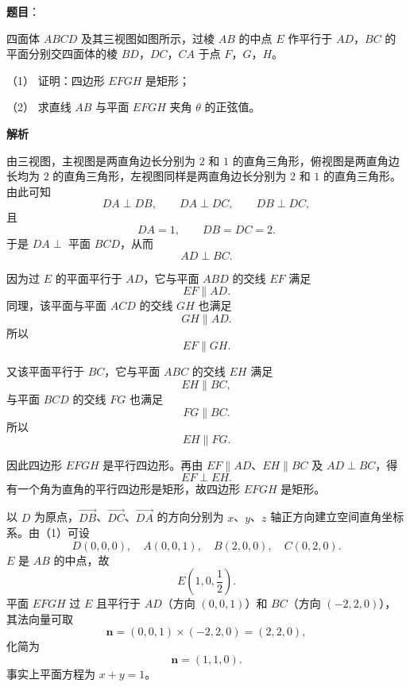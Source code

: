 \begin{answer}

\textbf{题目}：

四面体 $ABCD$ 及其三视图如图所示，过棱 $AB$ 的中点 $E$ 作平行于 $AD$，$BC$ 的平面分别交四面体的棱 $BD$，$DC$，$CA$ 于点 $F$，$G$，$H$。
\nopagebreak[4]
\begin{center}\end{center}
\nopagebreak[4]
（1） 证明：四边形 $EFGH$ 是矩形；

（2） 求直线 $AB$ 与平面 $EFGH$ 夹角 $\theta$ 的正弦值。

\textbf{解析}


由三视图，主视图是两直角边长分别为 $2$ 和 $1$ 的直角三角形，俯视图是两直角边长均为 $2$ 的直角三角形，左视图同样是两直角边长分别为 $2$ 和 $1$ 的直角三角形。由此可知
\nopagebreak[4]
\[DA\perp DB,\qquad DA\perp DC,\qquad DB\perp DC,\]
且
\nopagebreak[4]
\[DA=1,\qquad DB=DC=2.\]
于是 $DA\perp$ 平面 $BCD$，从而
\nopagebreak[4]
\[AD\perp BC.\]

因为过 $E$ 的平面平行于 $AD$，它与平面 $ABD$ 的交线 $EF$ 满足
\nopagebreak[4]
\[EF\parallel AD.\]
同理，该平面与平面 $ACD$ 的交线 $GH$ 也满足
\nopagebreak[4]
\[GH\parallel AD.\]
所以
\nopagebreak[4]
\[EF\parallel GH.\]

又该平面平行于 $BC$，它与平面 $ABC$ 的交线 $EH$ 满足
\nopagebreak[4]
\[EH\parallel BC,\]
与平面 $BCD$ 的交线 $FG$ 也满足
\nopagebreak[4]
\[FG\parallel BC.\]
所以
\nopagebreak[4]
\[EH\parallel FG.\]

因此四边形 $EFGH$ 是平行四边形。再由 $EF\parallel AD$、$EH\parallel BC$ 及 $AD\perp BC$，得
\nopagebreak[4]
\[EF\perp EH.\]
有一个角为直角的平行四边形是矩形，故四边形 $EFGH$ 是矩形。


以 $D$ 为原点，$\overrightarrow{DB}$、$\overrightarrow{DC}$、$\overrightarrow{DA}$ 的方向分别为 $x$、$y$、$z$ 轴正方向建立空间直角坐标系。由（1）可设
\nopagebreak[4]
\[D(0,0,0),\quad A(0,0,1),\quad B(2,0,0),\quad C(0,2,0).\]
$E$ 是 $AB$ 的中点，故
\nopagebreak[4]
\[E\left(1,0,\frac12\right).\]
平面 $EFGH$ 过 $E$ 且平行于 $AD$（方向 $(0,0,1)$）和 $BC$（方向 $(-2,2,0)$），其法向量可取
\nopagebreak[4]
\[\boldsymbol n=(0,0,1)\times(-2,2,0)=(2,2,0),\]
化简为
\nopagebreak[4]
\[\boldsymbol n=(1,1,0).\]
事实上平面方程为 $x+y=1$。


\end{answer}
